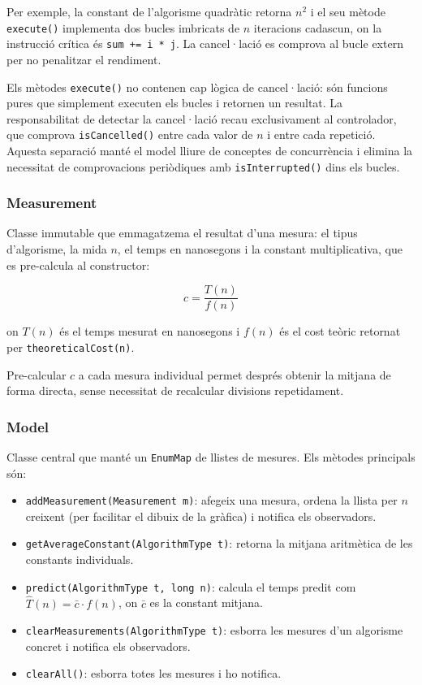 \documentclass[conference,compsoc]{IEEEtran}
\begin{document}
Per exemple, la constant de l'algorisme quadràtic retorna $n^2$ i el seu
mètode \texttt{execute()} implementa dos bucles imbricats de $n$ iteracions
cadascun, on la instrucció crítica és \texttt{sum += i * j}. La cancel·lació
es comprova al bucle extern per no penalitzar el rendiment.

Els mètodes \texttt{execute()} no contenen cap lògica de cancel·lació:
són funcions pures que simplement executen els bucles i retornen un
resultat. La responsabilitat de detectar la cancel·lació recau
exclusivament al controlador, que comprova \texttt{isCancelled()} entre
cada valor de $n$ i entre cada repetició. Aquesta separació manté el
model lliure de conceptes de concurrència i elimina la necessitat de
comprovacions periòdiques amb \texttt{isInterrupted()} dins els bucles.

\subsubsection{Measurement}

Classe immutable que emmagatzema el resultat d'una mesura: el tipus
d'algorisme, la mida $n$, el temps en nanosegons i la constant
multiplicativa, que es pre-calcula al constructor:

\begin{equation}
\label{eq:constant}
c = \frac{T(n)}{f(n)}
\end{equation}

on $T(n)$ és el temps mesurat en nanosegons i $f(n)$ és el cost teòric
retornat per \texttt{theoreticalCost(n)}.

Pre-calcular $c$ a cada mesura individual permet després obtenir la
mitjana de forma directa, sense necessitat de recalcular divisions
repetidament.

\subsubsection{Model}

Classe central que manté un \texttt{EnumMap} de llistes de mesures. Els
mètodes principals són:
\begin{itemize}
    \item \texttt{addMeasurement(Measurement m)}: afegeix una mesura,
          ordena la llista per $n$ creixent (per facilitar el dibuix de
          la gràfica) i notifica els observadors.
    \item \texttt{getAverageConstant(AlgorithmType t)}: retorna la mitjana
          aritmètica de les constants individuals.
    \item \texttt{predict(AlgorithmType t, long n)}: calcula el temps
          predit com $\hat{T}(n) = \bar{c} \cdot f(n)$, on $\bar{c}$ es
          la constant mitjana.
    \item \texttt{clearMeasurements(AlgorithmType t)}: esborra les mesures
          d'un algorisme concret i notifica els observadors.
    \item \texttt{clearAll()}: esborra totes les mesures i ho notifica.
\end{itemize}
\end{document}

